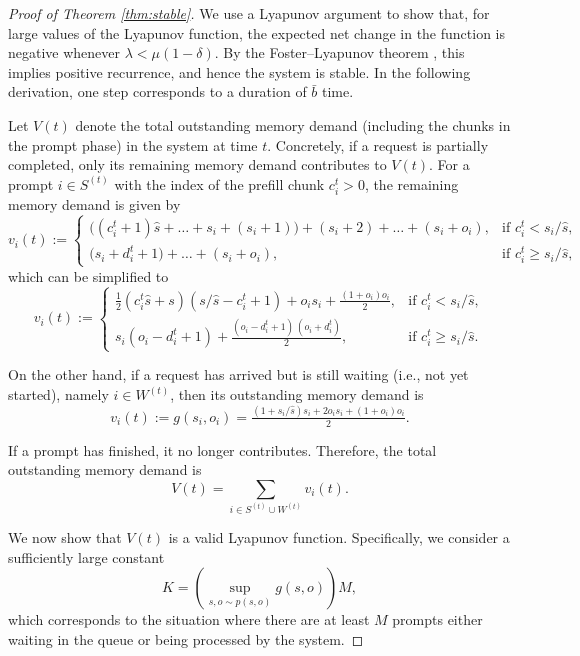 \documentclass{article}
\theoremstyle{plain}
\theoremstyle{definition}
\theoremstyle{remark}
\begin{document}
\begin{proof}[Proof of Theorem \ref{thm:stable}]

We use a Lyapunov argument to show that, for large values of the Lyapunov function, the expected net change in the function is negative whenever \(\lambda < \mu(1-\delta)\). By the Foster–Lyapunov theorem \citep[Section~5.1]{bremaud2013markov}, this implies positive recurrence, and hence the system is stable. In the following derivation, one step corresponds to a duration of \(\bar{b}\) time.


Let \(V(t)\) denote the total outstanding memory demand (including the 
chunks in the prompt phase) in the system at time \(t\). Concretely, if a 
request is partially completed, only its remaining memory demand 
contributes to \(V(t)\). For a prompt \(i \in S^{(t)}\) with the index of the prefill chunk $c_i^t>0$, the remaining memory demand is given by
\[
v_{i}(t) := 
\begin{cases}
\bigl((c_i^t+1)\hat{s}+\ldots+s_i+(s_{i}+1)\bigr) + (s_{i}+2)+\ldots+(s_{i}+o_{i}), 
& \text{if } c_i^t < s_{i}/\hat{s}, \\[0.8em]
\bigl(s_{i}+d_i^t+1\bigr)+\ldots+(s_{i}+o_{i}), 
& \text{if } c_i^t \geq s_{i}/\hat{s},
\end{cases}
\]
which can be simplified to
\[
v_{i}(t) :=
\begin{cases}
 \frac{1}{2} (c_i^t\hat{s}+ s) \left( s/\hat{s}-c_i^t+1 \right) 
+ o_{i}s_{i} + \tfrac{(1+o_{i})o_{i}}{2}, 
& \text{if } c_i^t < s_{i}/\hat{s}, \\[0.8em]
s_{i}\left(o_{i} - d_i^t+1\right) 
+ \tfrac{(o_{i}-d_i^t+1)\,(o_{i}+d_i^t)}{2}, 
& \text{if } c_i^t \geq s_{i}/\hat{s}.
\end{cases}
\]

On the other hand, if a request has arrived but is still waiting (i.e., 
not yet started), namely \(i \in W^{(t)}\), then its outstanding memory 
demand is
\[
v_i(t) := g(s_i,o_i) 
= \tfrac{(1+s_i/\hat{s})s_i + 2o_is_i + (1+o_i)o_i}{2}.
\]

If a prompt has finished, it no longer contributes. Therefore, the total 
outstanding memory demand is
\[
V(t) = \sum_{i \in S^{(t)} \cup W^{(t)}} v_i(t).
\]


We now show that \(V(t)\) is a valid Lyapunov function. Specifically, 
we consider a sufficiently large constant 
\[
K = \left(\sup_{s,o \sim p(s,o)} g(s,o)\right)M,
\]
which corresponds to the situation where there are at least 
$M$ prompts either waiting in the queue or being processed by the system.


\end{proof}
\end{document}
